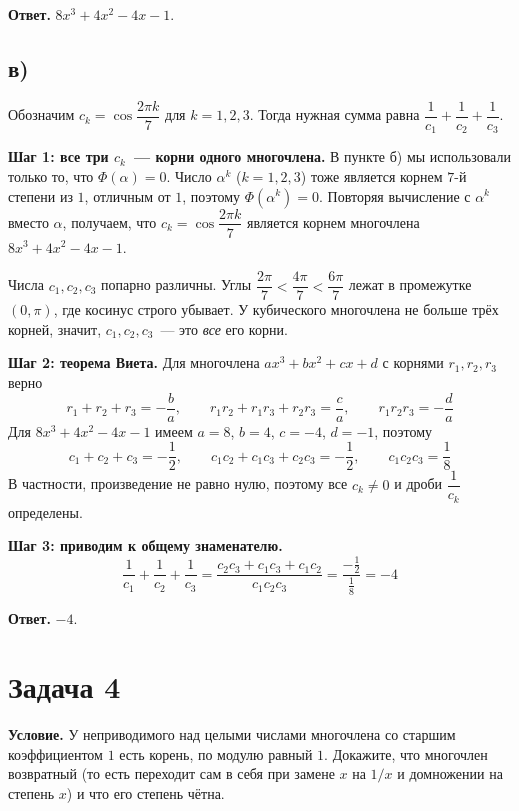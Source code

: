 \documentclass[12pt]{article}
\begin{document}
	\medskip
	\noindent
	\textbf{Ответ.} $8x^3 + 4x^2 - 4x - 1$.

	\subsection*{в)}

	Обозначим $c_k = \cos\dfrac{2\pi k}{7}$ для $k = 1, 2, 3$. Тогда нужная сумма равна $\dfrac{1}{c_1} + \dfrac{1}{c_2} + \dfrac{1}{c_3}$.

	\medskip
	\noindent
	\textbf{Шаг 1: все три $c_k$~--- корни одного многочлена.} В пункте б) мы использовали только то, что $\Phi(\alpha) = 0$. Число $\alpha^k$ ($k = 1, 2, 3$) тоже является корнем $7$-й степени из $1$, отличным от $1$, поэтому $\Phi(\alpha^k) = 0$. Повторяя вычисление с $\alpha^k$ вместо $\alpha$, получаем, что $c_k = \cos\dfrac{2\pi k}{7}$ является корнем многочлена $8x^3 + 4x^2 - 4x - 1$.

	Числа $c_1, c_2, c_3$ попарно различны. Углы $\dfrac{2\pi}{7} < \dfrac{4\pi}{7} < \dfrac{6\pi}{7}$ лежат в промежутке $(0, \pi)$, где косинус строго убывает. У кубического многочлена не больше трёх корней, значит, $c_1, c_2, c_3$~--- это \emph{все} его корни.

	\medskip
	\noindent
	\textbf{Шаг 2: теорема Виета.} Для многочлена $ax^3 + bx^2 + cx + d$ с корнями $r_1, r_2, r_3$ верно
	\[
		r_1 + r_2 + r_3 = -\frac{b}{a}, \qquad r_1r_2 + r_1r_3 + r_2r_3 = \frac{c}{a}, \qquad r_1r_2r_3 = -\frac{d}{a}
	\]
	Для $8x^3 + 4x^2 - 4x - 1$ имеем $a = 8$, $b = 4$, $c = -4$, $d = -1$, поэтому
	\[
		c_1 + c_2 + c_3 = -\frac{1}{2}, \qquad c_1c_2 + c_1c_3 + c_2c_3 = -\frac{1}{2}, \qquad c_1c_2c_3 = \frac{1}{8}
	\]
	В частности, произведение не равно нулю, поэтому все $c_k \neq 0$ и дроби $\dfrac{1}{c_k}$ определены.

	\medskip
	\noindent
	\textbf{Шаг 3: приводим к общему знаменателю.}
	\[
		\frac{1}{c_1} + \frac{1}{c_2} + \frac{1}{c_3} = \frac{c_2c_3 + c_1c_3 + c_1c_2}{c_1c_2c_3} = \frac{-\frac{1}{2}}{\frac{1}{8}} = -4
	\]

	\medskip
	\noindent
	\textbf{Ответ.} $-4$.

	\section*{Задача 4}

	\noindent
	\textbf{Условие.} У неприводимого над целыми числами многочлена со старшим коэффициентом $1$ есть корень, по модулю равный $1$. Докажите, что многочлен возвратный (то есть переходит сам в себя при замене $x$ на $1/x$ и домножении на степень $x$) и что его степень чётна.
\end{document}
